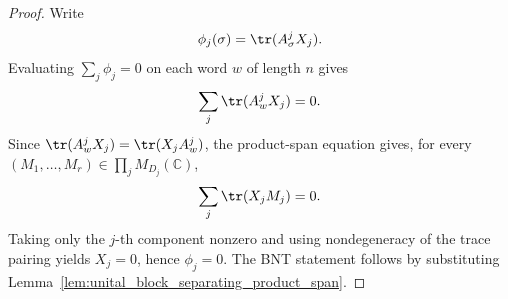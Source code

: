 \begin{proof}
    \leanok
    Write
    \[
        \phi_j(\sigma)=\tr(A^j_\sigma X_j).
    \]
    Evaluating \(\sum_j\phi_j=0\) on each word \(w\) of length \(n\) gives
    \[
        \sum_j\tr(A^j_wX_j)=0.
    \]
    Since \(\tr(A^j_wX_j)=\tr(X_jA^j_w)\), the product-span equation gives, for
    every \((M_1,\ldots,M_r)\in\prod_jM_{D_j}(\mathbb C)\),
    \[
        \sum_j\tr(X_jM_j)=0.
    \]
    Taking only the \(j\)-th component nonzero and using nondegeneracy of the
    trace pairing yields \(X_j=0\), hence \(\phi_j=0\). The BNT statement follows
    by substituting Lemma~\ref{lem:unital_block_separating_product_span}.
\end{proof}
